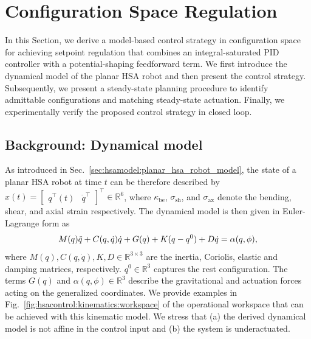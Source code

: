 \section{Configuration Space Regulation}\label{sec:hsacontrol:configuration_space_regulation}
In this Section, we derive a model-based control strategy in configuration space for achieving setpoint regulation that combines an integral-saturated PID controller with a potential-shaping feedforward term. We first introduce the dynamical model of the planar \gls{HSA} robot and then present the control strategy.
Subsequently, we present a steady-state planning procedure to identify admittable configurations and matching steady-state actuation.
Finally, we experimentally verify the proposed control strategy in closed loop.

\subsection{Background: Dynamical model}\label{sub:hsacontrol:model}
As introduced in Sec.~\ref{sec:hsamodel:planar_hsa_robot_model}, the state of a planar \gls{HSA} robot at time $t$ can be therefore described by $x(t) = \begin{bmatrix}
    q^\top(t) & \dot{q}^\top
\end{bmatrix}^\top \in \mathbb{R}^6$, where $\kappa_\mathrm{be}$, $\sigma_\mathrm{sh}$, and $\sigma_\mathrm{ax}$ denote the bending, shear, and axial strain respectively.
The dynamical model is then given in Euler-Lagrange form as
\begin{equation}\label{eq:hsacontrol:dynamics}
    M(q) \Ddot{q} + C(q,\dot{q})\dot{q} + G(q) + K (q - q^0) + D \dot{q} = \alpha(q,\phi),
\end{equation}
where $M(q),C(q,\dot{q}),K,D \in \mathbb{R}^{3 \times 3}$ are the inertia, Coriolis, elastic and damping matrices, respectively. $q^0 \in \mathbb{R}^3$ captures the rest configuration. The terms $G(q)$ and $\alpha(q,\phi) \in \mathbb{R}^3$ describe the gravitational and actuation forces acting on the generalized coordinates.
We provide examples in Fig.~\ref{fig:hsacontrol:kinematics:workspace} of the operational workspace that can be achieved with this kinematic model.
We stress that (a) the derived dynamical model is not affine in the control input and (b) the system is underactuated.

